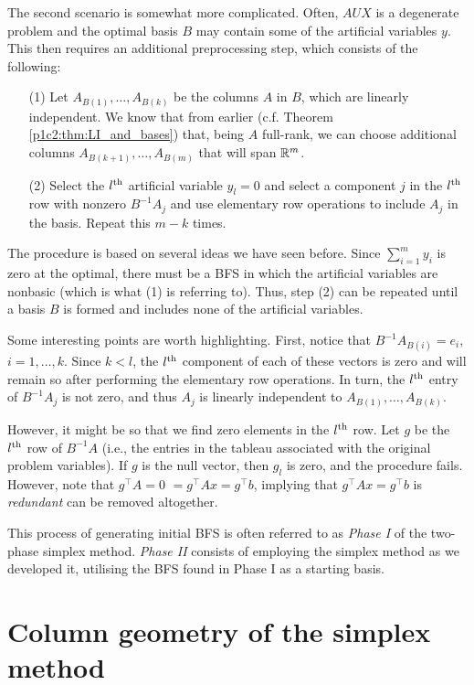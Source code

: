 The second scenario is somewhat more complicated. Often, $AUX$ is a degenerate problem and the optimal basis $B$ may contain some of the artificial variables $y$. This then requires an additional preprocessing step, which consists of the following:
%
\begin{enumerate}
	\item[(1)] Let $A_{B(1)}, \dots, A_{B(k)}$ be the columns $A$ in $B$, which are linearly independent. We know that from earlier (c.f. Theorem \ref{p1c2:thm:LI_and_bases}) that, being $A$ full-rank, we can choose additional columns $A_{B(k+1)}, \dots, A_{B(m)}$ that will span $\mathbb{R}^{m}$.
	\item[(2)] Select the $l^\text{th}$ artificial variable $y_l = 0$ and select a component $j$ in the $l^\text{th}$ row with nonzero $B^{-1}A_j$ and use elementary row operations to include $A_j$ in the basis. Repeat this $m-k$ times.
\end{enumerate}

The procedure is based on several ideas we have seen before. Since $\sum_{i=1}^m y_i$ is zero at the optimal, there must be a BFS in which the artificial variables are nonbasic (which is what (1) is referring to). Thus, step (2) can be repeated until a basis $B$ is formed and includes none of the artificial variables. 

Some interesting points are worth highlighting. First, notice that $B^{-1}A_{B(i)} = e_i$, $i=1, \dots, k$. Since $k < l$, the $l^\text{th}$ component of each of these vectors is zero and will remain so after performing the elementary row operations. In turn, the $l^\text{th}$ entry of $B^{-1}A_j$ is not zero, and thus $A_j$ is linearly independent to $A_{B(1)}, \dots, A_{B(k)}$. 

However, it might be so that we find zero elements in the $l^\text{th}$ row. Let $g$ be the $l^\text{th}$ row of $B^{-1}A$ (i.e., the entries in the tableau associated with the original problem variables). If $g$ is the null vector, then $g_l$ is zero, and the procedure fails. However, note that $g^\top A = 0 $ $= g^\top Ax = g^\top b$, implying that $g^\top Ax = g^\top b$ is \emph{redundant} can be removed altogether. 

This process of generating initial BFS is often referred to as \emph{Phase I} of the two-phase simplex method. \emph{Phase II} consists of employing the simplex method as we developed it, utilising the BFS found in Phase I as a starting basis.


\section{Column geometry of the simplex method}

